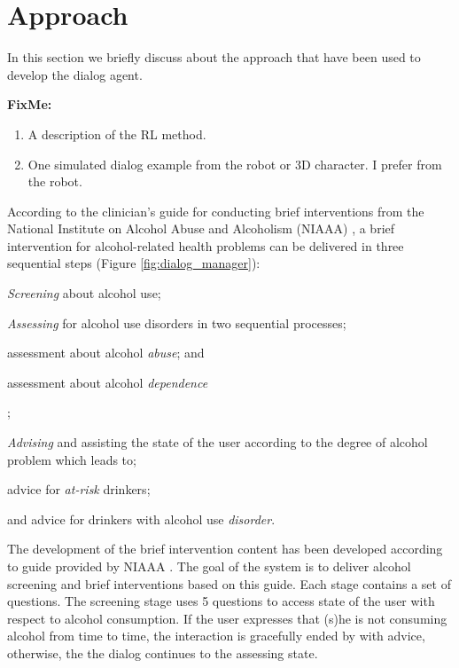 \documentclass[letterpaper]{article}
\begin{document}
\section*{Approach}

In this section we briefly discuss about the approach that have been used to develop the dialog 
agent. 

{ \color{red}
\textbf{FixMe:}
\begin{enumerate}
 \item A description of the RL method. 
 \item One simulated dialog example from the robot or 3D character. I prefer from the robot. 
\end{enumerate}
}

According to the clinician's guide for conducting brief interventions from the National Institute on 
Alcohol Abuse and Alcoholism (NIAAA) \cite{national2007helping}, a brief intervention for 
alcohol-related health problems can be delivered in three sequential steps (Figure 
\ref{fig:dialog_manager}): \begin{inparaenum}[1)]
\item {\em Screening} about alcohol use; \item {\em Assessing} for alcohol use disorders in two 
sequential processes; \begin{inparaenum}[a)] \item assessment about alcohol {\em abuse}; and \item 
assessment about alcohol {\em dependence}\end{inparaenum}; \item {\em Advising} and assisting the 
state of the user according to the degree of alcohol problem which leads to; 
\begin{inparaenum} \item advice for {\em at-risk} drinkers; \item and advice for drinkers with 
alcohol use {\em disorder}. \end{inparaenum} \end{inparaenum}

The development of the brief intervention content has been developed according to guide provided by 
NIAAA \cite{national2006niaaa}. The goal of the system is to deliver alcohol screening and 
brief interventions based on this guide. Each stage contains a set of questions. The screening stage 
uses 5 questions to access state of the user with respect to alcohol consumption.  If the user 
expresses that (s)he is not consuming alcohol from time to time, the interaction is gracefully ended 
by with advice, otherwise, the the dialog continues to the assessing state.  
\end{document}
